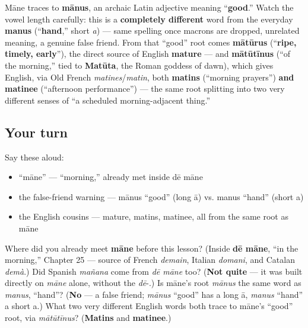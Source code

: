 \begin{cousinweb}
Māne traces to \textbf{mānus}, an archaic Latin adjective meaning \textquotedblleft{}\textbf{good}.\textquotedblright{} Watch the vowel length carefully: this is a \textbf{completely different} word from the everyday \textbf{manus} (\textquotedblleft{}\textbf{hand},\textquotedblright{} short \emph{a}) — same spelling once macrons are dropped, unrelated meaning, a genuine false friend. From that \textquotedblleft{}good\textquotedblright{} root comes \textbf{mātūrus} (\textquotedblleft{}\textbf{ripe, timely, early}\textquotedblright{}), the direct source of English \textbf{mature} — and \textbf{mātūtīnus} (\textquotedblleft{}of the morning,\textquotedblright{} tied to \textbf{Matūta}, the Roman goddess of dawn), which gives English, via Old French \emph{matines}/\emph{matin}, both \textbf{matins} (\textquotedblleft{}morning prayers\textquotedblright{}) \textbf{and} \textbf{matinee} (\textquotedblleft{}afternoon performance\textquotedblright{}) — the same root splitting into two very different senses of \textquotedblleft{}a scheduled morning-adjacent thing.\textquotedblright{}
\end{cousinweb}

\subsection*{Your turn}
Say these aloud:

\begin{itemize}
\raggedright
  \item \textquotedblleft{}māne\textquotedblright{} — \textquotedblleft{}morning,\textquotedblright{} already met inside dē māne
  \item the false-friend warning — mānus \textquotedblleft{}good\textquotedblright{} (long ā) vs. manus \textquotedblleft{}hand\textquotedblright{} (short a)
  \item the English cousins — mature, matins, matinee, all from the same root as māne
\end{itemize}

\begin{tcolorbox}[breakable,colback=teal!4,colframe=teal!35!black,title={Before you move on}]
Where did you already meet \textbf{māne} before this lesson? (Inside \textbf{dē māne}, \textquotedblleft{}in the morning,\textquotedblright{} Chapter 25 — source of French \emph{demain}, Italian \emph{domani}, and Catalan \emph{demà}.) Did Spanish \emph{mañana} come from \emph{dē māne} too? (\textbf{Not quite} — it was built directly on \emph{māne} alone, without the \emph{dē}-.) Is māne's root \emph{mānus} the same word as \emph{manus}, \textquotedblleft{}hand\textquotedblright{}? (\textbf{No} — a false friend; \emph{mānus} \textquotedblleft{}good\textquotedblright{} has a long ā, \emph{manus} \textquotedblleft{}hand\textquotedblright{} a short a.) What two very different English words both trace to māne's \textquotedblleft{}good\textquotedblright{} root, via \emph{mātūtīnus}? (\textbf{Matins} and \textbf{matinee}.)
\end{tcolorbox}
